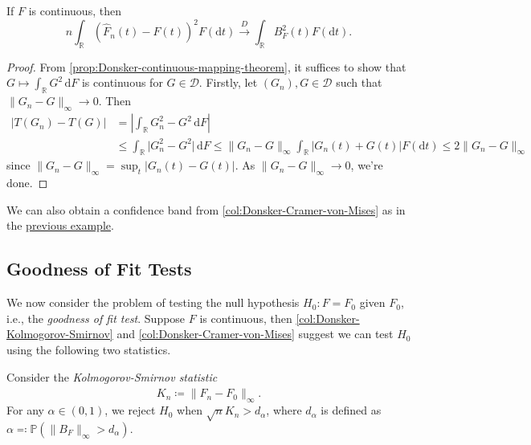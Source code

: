 \begin{corollary}\label{col:Donsker-Cramer-von-Mises}
	If \(F\) is continuous, then
	\[
		n \int _\mathbb{R} \left( \hat{F} _n(t) - F(t) \right) ^2 F(\mathrm{d} t)
		\overset{D}{\to} \int _\mathbb{R} B_F^2(t) F(\mathrm{d} t).
	\]
\end{corollary}
\begin{proof}
	From \autoref{prop:Donsker-continuous-mapping-theorem}, it suffices to show that \(G \mapsto \int _\mathbb{R} G^2 \,\mathrm{d} F\) is continuous for \(G \in \mathcal{D} \). Firstly, let \((G_n), G \in \mathcal{D} \) such that \(\lVert G_n - G \rVert _\infty \to 0\). Then
	\[
		\begin{split}
			\vert T(G_n) - T(G) \vert
			 & = \left\vert \int _\mathbb{R} G^2_n - G^2 \,\mathrm{d} F \right\vert \\
			 & \leq \int _\mathbb{R} \vert G_n^2 - G^2 \vert \,\mathrm{d} F
			\leq \lVert G_n - G \rVert _\infty \int _\mathbb{R} \vert G_n(t) + G(t) \vert F(\mathrm{d} t)
			\leq 2 \lVert G_n - G \rVert _\infty
		\end{split}
	\]
	since \(\lVert G_n - G \rVert _\infty = \sup _t \vert G_n(t) - G(t) \vert \). As \(\lVert G_n - G \rVert _\infty \to 0\), we're done.
\end{proof}

\begin{note}
	We can also obtain a confidence band from \autoref{col:Donsker-Cramer-von-Mises} as in the \hyperref[eg:confidence-band-Kolmogorov-Smirnov]{previous example}.
\end{note}

\subsection{Goodness of Fit Tests}
We now consider the problem of testing the null hypothesis \(H_0 \colon F = F_0\) given \(F_0\), i.e., the \emph{goodness of fit test}. Suppose \(F\) is continuous, then \autoref{col:Donsker-Kolmogorov-Smirnov} and \autoref{col:Donsker-Cramer-von-Mises} suggest we can test \(H_0\) using the following two statistics.

\begin{eg}\label{eg:goodness-of-fit-Kolmogorov-Smirnov}
	Consider the \emph{Kolmogorov-Smirnov statistic}
	\[
		K_n \coloneqq \lVert \hat{F} _n - F_0 \rVert _\infty.
	\]
	For any \(\alpha \in (0, 1)\), we reject \(H_0\) when \(\sqrt{n} K_n > d_\alpha \), where \(d_\alpha \) is defined as \(\alpha \eqqcolon \mathbb{P} (\lVert B_F \rVert _\infty > d_\alpha )\).
\end{eg}

